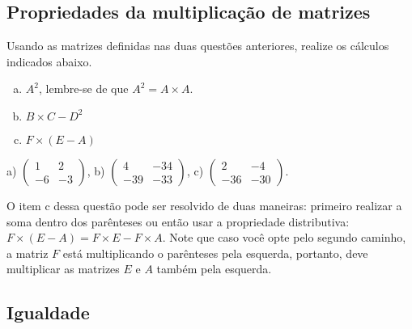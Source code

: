 \documentclass[main.tex]{subfiles}
\begin{document}
\subsection*{Propriedades da multiplicação de matrizes}

\begin{questao}
Usando as matrizes definidas nas duas questões anteriores, realize os cálculos indicados abaixo.
\begin{enumerate}[a)]
\item $A^2$, lembre-se de que $A^2=A \times A$.
\item $B \times C - D^2$
\item $F \times (E-A)$ 
\end{enumerate}
\end{questao}

\begin{gabarito}
	\begin{gabaritoQuestao}
		a) $\begin{pmatrix} 1 & 2 \\ -6 & -3\end{pmatrix}$, b) $\begin{pmatrix} 4 & -34 \\ -39 & -33\end{pmatrix}$, c) $\begin{pmatrix} 2 & -4 \\ -36 & -30\end{pmatrix}$.
	\end{gabaritoQuestao}
\end{gabarito}

O item c dessa questão pode ser resolvido de duas maneiras: primeiro realizar a soma dentro dos parênteses ou então usar a propriedade distributiva: $F \times (E-A) = F \times E - F \times A$. Note que caso você opte pelo segundo caminho, a matriz $F$ está multiplicando o parênteses pela esquerda, portanto, deve multiplicar as matrizes $E$ e $A$ também pela esquerda.

\subsection*{Igualdade}
\end{document}
